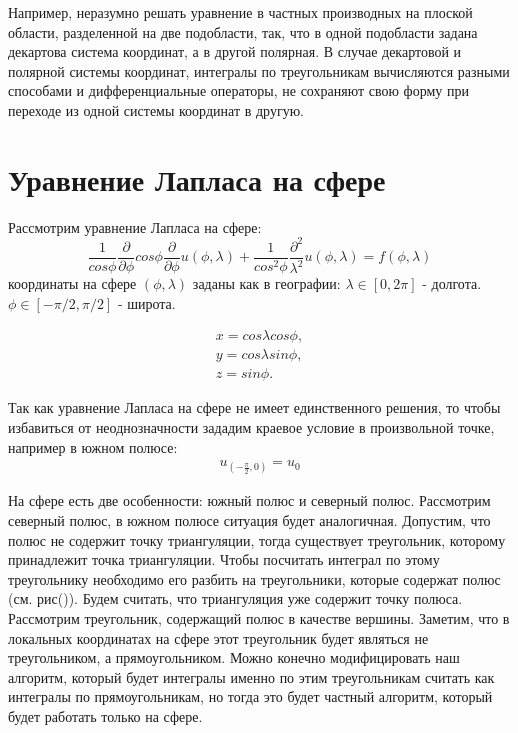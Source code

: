 \documentclass[a4paper,article]{article}
\begin{document}
\begin{eqaution*}
Например, неразумно решать уравнение в частных производных на плоской
области, разделенной на две подобласти, так, что в одной подобласти
задана декартова система координат, а в другой полярная. В случае
декартовой и полярной системы координат, интегралы по треугольникам
вычисляются разными способами и дифференциальные
операторы, не сохраняют свою форму при переходе из одной системы
координат в другую.

\section*{Уравнение Лапласа на сфере}
Рассмотрим уравнение Лапласа на сфере:
\begin{equation*}
\frac{1}{cos\phi}\frac{\partial}{\partial\phi}
cos\phi\frac{\partial}{\partial\phi} u(\phi, \lambda) +
\frac{1}{cos^2\phi}\frac{\partial^2}
{\lambda^2} u(\phi, \lambda) = f(\phi, \lambda)
\end{equation*}
координаты на сфере $(\phi,\lambda)$ заданы как в географии:
$\lambda \in [0,2\pi]$ - долгота. $\phi \in [-\pi/2,\pi/2]$ - широта.

\begin{equation}\label{sphere_coord}
\begin{split}
x = cos \lambda cos \phi, \\
y = cos \lambda sin \phi, \\
z = sin \phi. 
\end{split}
\end{equation}

Так как уравнение Лапласа на сфере не имеет единственного решения, то
чтобы избавиться от неоднозначности зададим краевое условие в
произвольной точке, например в южном полюсе:
\begin{equation*}
\begin{split}
u_{(-\frac{\pi}{2},0)}=u_0
\end{split}
\end{equation*} 

На сфере есть две особенности: южный полюс и северный
полюс. Рассмотрим северный полюс, в южном полюсе ситуация будет
аналогичная. Допустим, что полюс не содержит точку триангуляции, тогда
существует треугольник, которому принадлежит точка триангуляции. Чтобы
посчитать интеграл по этому треугольнику необходимо его разбить на
треугольники, которые содержат полюс (см. рис()). Будем считать,
что триангуляция уже содержит точку полюса. Рассмотрим треугольник,
содержащий полюс в качестве вершины. Заметим, что в локальных
координатах на сфере этот треугольник будет являться не треугольником,
а прямоугольником. Можно конечно модифицировать наш алгоритм, который
будет интегралы именно по этим треугольникам считать как интегралы по
прямоугольникам, но тогда это будет частный алгоритм, который будет
работать только на сфере. 


\end{eqaution*}
\end{document}
